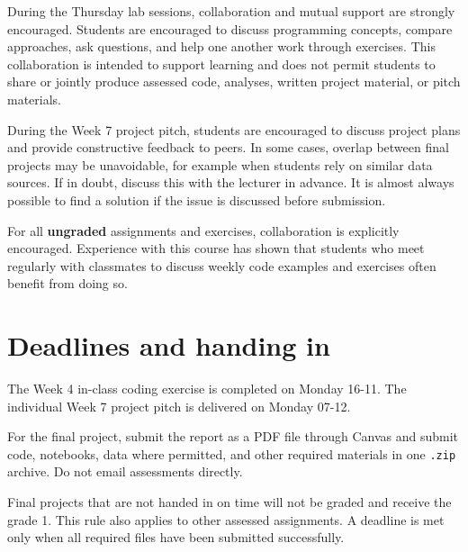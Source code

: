 \documentclass[a4paper,10pt,twocolumn]{report}
\begin{document}
During the Thursday lab sessions, collaboration and mutual support are strongly encouraged. Students are encouraged to discuss programming concepts, compare approaches, ask questions, and help one another work through exercises. This collaboration is intended to support learning and does not permit students to share or jointly produce assessed code, analyses, written project material, or pitch materials.

During the Week 7 project pitch, students are encouraged to discuss project plans and provide constructive feedback to peers. In some cases, overlap between final projects may be unavoidable, for example when students rely on similar data sources. If in doubt, discuss this with the lecturer in advance. It is almost always possible to find a solution if the issue is discussed before submission.

For all \textbf{ungraded} assignments and exercises, collaboration is explicitly encouraged. Experience with this course has shown that students who meet regularly with classmates to discuss weekly code examples and exercises often benefit from doing so.

\section{Deadlines and handing in}

The Week 4 in-class coding exercise is completed on Monday 16-11. The individual Week 7 project pitch is delivered on Monday 07-12. 

For the final project, submit the report as a PDF file through Canvas and submit code, notebooks, data where permitted, and other required materials in one \texttt{.zip} archive. Do not email assessments directly.

Final projects that are not handed in on time will not be graded and receive the grade 1. This rule also applies to other assessed assignments. A deadline is met only when all required files have been submitted successfully.
\end{document}
